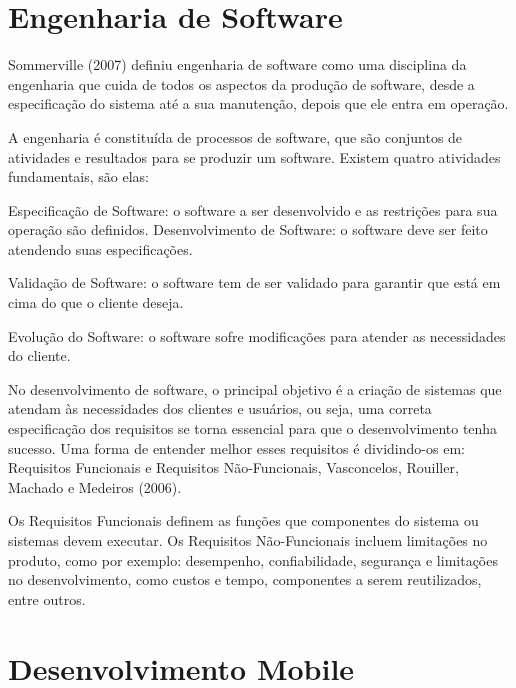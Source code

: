 \section{Engenharia de Software}
\label{sec:engenharia-de-software}

Sommerville (2007) definiu engenharia de software como uma disciplina da engenharia que cuida de todos os aspectos da produção de software, desde a especificação do sistema até a sua manutenção, depois que ele entra em operação.

A engenharia é constituída de processos de software, que são conjuntos de atividades e resultados para se produzir um software. Existem quatro atividades fundamentais, são elas: 
\begin{alineascomponto}

\item Especificação de Software: o software a ser desenvolvido e as restrições para sua operação são definidos. 
Desenvolvimento de Software: o software deve ser feito atendendo suas especificações.
\item Validação de Software: o software tem de ser validado para garantir que está em cima do que o cliente deseja. 
\item Evolução do Software: o software sofre modificações para atender as necessidades do cliente.
\end{alineascomponto}

No desenvolvimento de software, o principal objetivo é a criação de sistemas que atendam às necessidades dos clientes e usuários, ou seja, uma correta especificação dos requisitos se torna essencial para que o desenvolvimento tenha sucesso. Uma forma de entender melhor esses requisitos é dividindo-os em: Requisitos Funcionais e Requisitos Não-Funcionais, Vasconcelos, Rouiller, Machado e Medeiros (2006).


Os Requisitos Funcionais definem as funções que componentes do sistema ou sistemas devem executar. 
Os Requisitos Não-Funcionais incluem limitações no produto, como por exemplo: desempenho, confiabilidade, segurança e limitações no desenvolvimento, como custos e tempo, componentes a serem reutilizados, entre outros.

\section{Desenvolvimento Mobile}
\label{sec:desenvolvimento-mobile}

